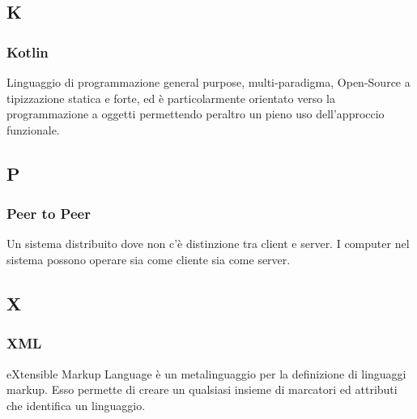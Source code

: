 \subsection*{K}
\subsubsection*{Kotlin}
Linguaggio di programmazione general purpose, multi-paradigma, Open-Source a tipizzazione statica e forte, ed è particolarmente orientato verso la programmazione a oggetti permettendo
peraltro un pieno uso dell'approccio funzionale.

\subsection*{P}
\subsubsection*{Peer to Peer}
Un sistema distribuito dove non c'è distinzione tra client e server. I computer nel sistema possono operare sia come cliente sia come server. 

\subsection*{X}
\subsubsection*{XML}
eXtensible Markup Language è un metalinguaggio per la definizione di linguaggi markup. Esso permette di creare un qualsiasi insieme di marcatori ed attributi che identifica un linguaggio.